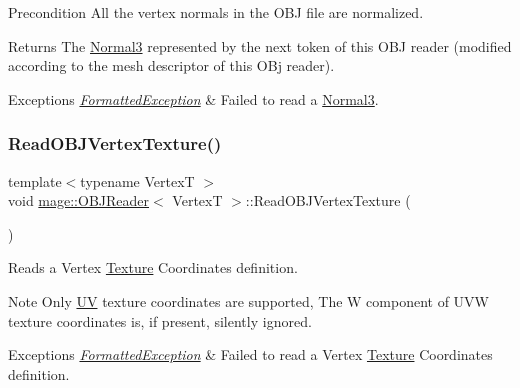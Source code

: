 \begin{DoxyPrecond}{Precondition}
All the vertex normals in the O\+BJ file are normalized. 
\end{DoxyPrecond}
\begin{DoxyReturn}{Returns}
The {\ttfamily \hyperlink{structmage_1_1_normal3}{Normal3}} represented by the next token of this O\+BJ reader (modified according to the mesh descriptor of this O\+Bj reader). 
\end{DoxyReturn}

\begin{DoxyExceptions}{Exceptions}
{\em \hyperlink{classmage_1_1_formatted_exception}{Formatted\+Exception}} & Failed to read a {\ttfamily \hyperlink{structmage_1_1_normal3}{Normal3}}. \\
\hline
\end{DoxyExceptions}
\hypertarget{classmage_1_1_o_b_j_reader_ae0dfedd81f23e6e15725e9ef02dd3034}{}\label{classmage_1_1_o_b_j_reader_ae0dfedd81f23e6e15725e9ef02dd3034} 
\subsubsection{\texorpdfstring{Read\+O\+B\+J\+Vertex\+Texture()}{ReadOBJVertexTexture()}}
{\footnotesize\ttfamily template$<$typename VertexT $>$ \\
void \hyperlink{classmage_1_1_o_b_j_reader}{mage\+::\+O\+B\+J\+Reader}$<$ VertexT $>$\+::Read\+O\+B\+J\+Vertex\+Texture (\begin{DoxyParamCaption}{ }\end{DoxyParamCaption})\hspace{0.3cm}{\ttfamily [private]}}

Reads a Vertex \hyperlink{classmage_1_1_texture}{Texture} Coordinates definition.

\begin{DoxyNote}{Note}
Only \hyperlink{structmage_1_1_u_v}{UV} texture coordinates are supported, The W component of U\+VW texture coordinates is, if present, silently ignored. 
\end{DoxyNote}

\begin{DoxyExceptions}{Exceptions}
{\em \hyperlink{classmage_1_1_formatted_exception}{Formatted\+Exception}} & Failed to read a Vertex \hyperlink{classmage_1_1_texture}{Texture} Coordinates definition. \\
\hline
\end{DoxyExceptions}
\hypertarget{classmage_1_1_o_b_j_reader_a9b1a38d60a9d1c5c9095394fa37375e6}{}\label{classmage_1_1_o_b_j_reader_a9b1a38d60a9d1c5c9095394fa37375e6} 
